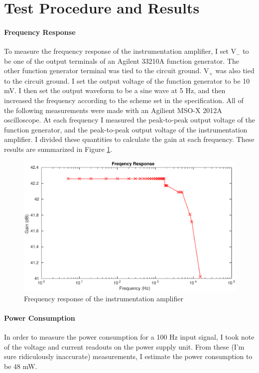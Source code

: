 \documentclass[justified,nobib]{tufte-handout}
\begin{document}
\section{Test Procedure and Results}
\paragraph{Frequency Response} To measure the frequency response of the
instrumentation amplifier, I set V$_{-}$ to be one of the output terminals of
an Agilent 33210A function generator. The other function generator terminal was
tied to the circuit ground. V$_{+}$ was also tied to the circuit ground. I set
the output voltage of the function generator to be 10 mV. I then set the output
waveform to be a sine wave at 5 Hz, and then increased the frequency according
to the scheme set in the specification. All of the following measurements were
made with an Agilient MSO-X 2012A oscilloscope. At each frequency I measured the
peak-to-peak output voltage of the function generator, and the peak-to-peak 
output voltage of the instrumentation amplifier. I divided these quantities to
calculate the gain at each frequency. These results are summarized in Figure
\ref{freqr}.

\begin{figure}
\centering
\label{freqr}
\includegraphics[width=0.9\linewidth]{freq.pdf}
\caption{Frequency response of the instrumentation amplifier}
\end{figure}
\paragraph{Power Consumption}
In order to measure the power consumption for a 100 Hz input signal, I took note
of the voltage and current readouts on the power supply unit. From these (I'm
sure ridiculously inaccurate) measurements, I estimate the power consumption to
be 48 mW.
\end{document}
